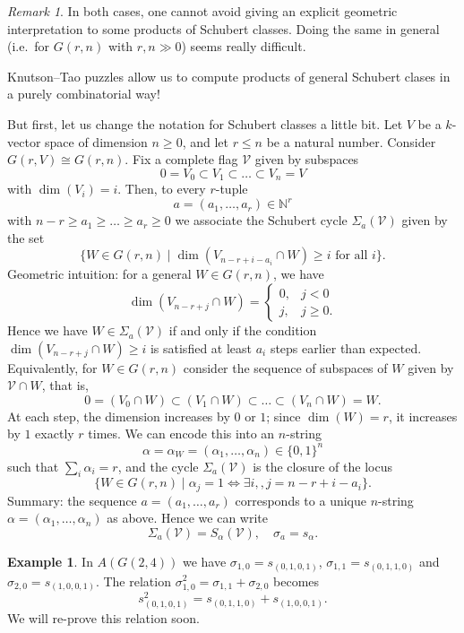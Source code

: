 \documentclass[12pt,a4paper]{amsart}
\theoremstyle{plain}
\theoremstyle{definition}
\newtheorem{exmp}[thm]{Example}
\theoremstyle{remark}
\newtheorem{rem}[thm]{Remark}
\begin{document}
\begin{rem}
  In both cases, one cannot avoid giving an explicit geometric interpretation to some products of Schubert classes.
  Doing the same in general (i.e.~for $G(r,n)$ with $r,n \gg 0$) seems really difficult.
\end{rem}

Knutson--Tao puzzles allow us to compute products of general Schubert clases in a purely combinatorial way!

But first, let us change the notation for Schubert classes a little bit.
Let $V$ be a $k$-vector space of dimension $n \geq 0$, and let $r \leq n$ be a natural number.
Consider $G(r,V) \cong G(r,n)$.
Fix a complete flag $\mathcal{V}$ given by subspaces
\[ 0 = V_{0} \subset V_{1} \subset \ldots \subset V_{n} = V \]
with $\dim(V_{i}) = i$.
Then, to every $r$-tuple
\[ a = (a_{1}, \ldots, a_{r}) \in \mathbb{N}^{r} \]
with $n - r \geq a_{1} \geq \ldots \geq a_{r} \geq 0$ we associate the Schubert cycle $\Sigma_{a}(\mathcal{V})$ given by the set
\[ \{ W \in G(r,n) \mid \dim(V_{n-r+i-a_{i}} \cap W) \geq i \text{ for all }i \}. \]
Geometric intuition: for a general $W \in G(r,n)$, we have
\[ \dim(V_{n-r+j} \cap W) = \begin{cases}
  0, & j < 0 \\
  j, & j\geq 0.
\end{cases} \]
Hence we have $W \in \Sigma_{a}(\mathcal{V})$ if and only if the condition $\dim(V_{n-r+j} \cap W) \geq i$ is satisfied at least $a_{i}$ steps earlier than expected.
Equivalently, for $W \in G(r,n)$ consider the sequence of subspaces of $W$ given by $\mathcal{V} \cap W$, that is,
\[ 0 = (V_{0} \cap W) \subset (V_{1} \cap W) \subset \ldots \subset (V_{n} \cap W) = W. \]
At each step, the dimension increases by $0$ or $1$; since $\dim(W) = r$, it increases by $1$ exactly $r$ times.
We can encode this into an $n$-string
\[ \alpha = \alpha_{W} = (\alpha_{1}, \ldots, \alpha_{n}) \in \{ 0, 1\}^{n} \]
such that $\sum_{i} \alpha_{i} = r$, and the cycle $\Sigma_{a}(\mathcal{V})$ is the closure of the locus
\[ \{ W \in G(r,n) \mid \alpha_{j} = 1 \Leftrightarrow \exists i,, j = n - r + i - a_{i} \}. \]
Summary: the sequence $a = (a_{1}, \ldots, a_{r})$ corresponds to a unique $n$-string $\alpha = (\alpha_{1}, \ldots, \alpha_{n})$ as above.
Hence we can write
\[ \Sigma_{a}(\mathcal{V}) = S_{\alpha}(\mathcal{V}), \quad \sigma_{a} = s_{\alpha}. \]

\begin{exmp}
  In $A(G(2,4))$ we have $\sigma_{1,0} = s_{(0,1,0,1)}$, $\sigma_{1,1} = s_{(0,1,1,0)}$ and $\sigma_{2,0} = s_{(1,0,0,1)}$.
  The relation $\sigma_{1,0}^{2} = \sigma_{1,1} + \sigma_{2,0}$ becomes
  \[ s_{(0,1,0,1)}^{2} = s_{(0,1,1,0)} + s_{(1,0,0,1)}. \]
  We will re-prove this relation soon.
\end{exmp}




\vfill
\end{document}
